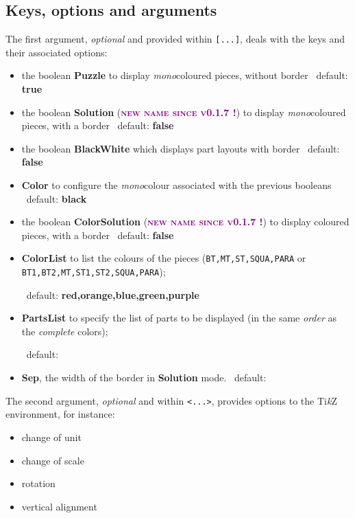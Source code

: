 \documentclass{article}
\providecommand\tikzlogo{Ti\textit{k}Z}
\newcommand\Cle[1]{{\bfseries\sffamily\textlangle #1\textrangle}}
\begin{document}
\subsection{Keys, options and arguments}

The first argument, \textit{optional} and provided within \texttt{[...]}, deals with the keys and their associated options:

\begin{itemize}
	\item the boolean \Cle{Puzzle} to display \textit{mono}coloured pieces, without border \hfill~default: \Cle{true}
	\item the boolean \Cle{Solution} (\textsc{\textcolor{purple}{\scriptsize\textbf{new name since v0.1.7 !}}}) to display \textit{mono}coloured pieces, with a border \hfill~default: \Cle{false}
	\item the boolean \Cle{BlackWhite} which displays part layouts with border \hfill~default: \Cle{false}
	\item \Cle{Color} to configure the \textit{mono}colour associated with the previous booleans \hfill~default: \Cle{black}
	\item the boolean \Cle{ColorSolution} (\textsc{\textcolor{purple}{\scriptsize\textbf{new name since v0.1.7 !}}}) to display coloured pieces, with a border \hfill~default: \Cle{false}
	\item \Cle{ColorList} to list the colours of the pieces (\texttt{BT,MT,ST,SQUA,PARA} or \texttt{BT1,BT2,MT,ST1,ST2,SQUA,PARA});
	
	\hfill~default: \Cle{red,orange,blue,green,purple}
	\item \Cle{PartsList} to specify the list of parts to be displayed (in the same \textit{order} as the \textit{complete} colors);
	
	\hfill~default: \Cle{1234567}
	\item \Cle{Sep}, the width of the border in \Cle{Solution} mode. \hfill~default: \Cle{1pt}
\end{itemize}

The second argument, \textit{optional} and within \texttt{<...>}, provides options to the \tikzlogo{} environment, for instance:

\begin{itemize}
	\item change of unit
	\item change of scale
	\item rotation
	\item vertical alignment
\end{itemize}
\end{document}
